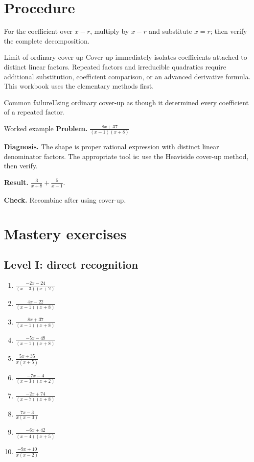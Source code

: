 \documentclass[11pt,oneside]{book}
\begin{document}
\section{Procedure}
For the coefficient over $x-r$, multiply by $x-r$ and substitute $x=r$; then verify the complete decomposition.

\begin{warningbox}{Limit of ordinary cover-up}
Cover-up immediately isolates coefficients attached to distinct linear factors. Repeated factors and irreducible quadratics require additional substitution, coefficient comparison, or an advanced derivative formula. This workbook uses the elementary methods first.
\end{warningbox}
\begin{warningbox}{Common failure}Using ordinary cover-up as though it determined every coefficient of a repeated factor.\end{warningbox}
\begin{examplebox}{Worked example}
\textbf{Problem.} $\displaystyle \frac{8 x + 37}{\left(x - 1\right) \left(x + 8\right)}$

\textbf{Diagnosis.} The shape is proper rational expression with distinct linear denominator factors. The appropriate tool is: use the Heaviside cover-up method, then verify.

\textbf{Result.} $\displaystyle \frac{3}{x + 8} + \frac{5}{x - 1}$.

\textbf{Check.} Recombine after using cover-up.
\end{examplebox}
\section{Mastery exercises}
\subsection*{Level I: direct recognition}
\begin{enumerate}[leftmargin=*,label=\textbf{\arabic*.},itemsep=0.65\baselineskip]
\item $\displaystyle \frac{- 2 x - 24}{\left(x - 3\right) \left(x + 2\right)}$
\item $\displaystyle \frac{4 x - 22}{\left(x - 1\right) \left(x + 8\right)}$
\item $\displaystyle \frac{8 x + 37}{\left(x - 1\right) \left(x + 8\right)}$
\item $\displaystyle \frac{- 5 x - 49}{\left(x - 1\right) \left(x + 8\right)}$
\item $\displaystyle \frac{5 x + 35}{x \left(x + 5\right)}$
\item $\displaystyle \frac{- 7 x - 4}{\left(x - 3\right) \left(x + 2\right)}$
\item $\displaystyle \frac{- 2 x + 74}{\left(x - 7\right) \left(x + 8\right)}$
\item $\displaystyle \frac{7 x - 3}{x \left(x - 3\right)}$
\item $\displaystyle \frac{- 6 x + 42}{\left(x - 4\right) \left(x + 5\right)}$
\item $\displaystyle \frac{- 9 x + 10}{x \left(x - 2\right)}$
\end{enumerate}
\end{document}
